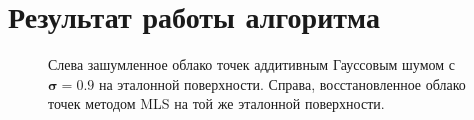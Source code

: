 \section{Результат работы алгоритма}

\begin{figure}
  \centering
  \caption{Слева зашумленное облако точек аддитивным Гауссовым шумом с $\boldsymbol{\sigma = 0.9}$ на эталонной поверхности. Справа, восстановленное облако точек методом MLS на той же эталонной поверхности.}
\end{figure}


